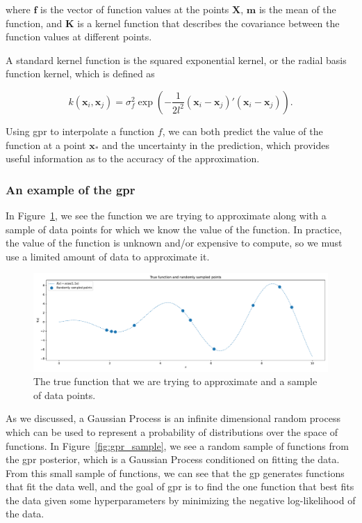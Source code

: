 \documentclass{article}
\begin{document}
where $\mathbf{f}$ is the vector of function values at the points $\mathbf{X}$, $\mathbf{m}$ is the mean of the function, and $\mathbf{K}$ is a kernel function that describes the covariance between the function values at different points.

A standard kernel function is the squared exponential kernel, or the radial basis function kernel, which is defined as

\begin{equation}
k(\mathbf{x}_i, \mathbf{x}_j) = \sigma^2_f \exp\left(-\frac{1}{2l^2} (\mathbf{x}_i - \mathbf{x}_j)' (\mathbf{x}_i -
    \mathbf{x}_j)\right).
\end{equation}

Using \acrshort{gpr} to interpolate a function $f$, we can both predict the value of the function at a point $\mathbf{x}_*$ and the uncertainty in the prediction, which provides useful information as to the accuracy of the approximation.

\subsubsection{An example of the \acrshort{gpr}}

In Figure~\ref{fig:true_function}, we see the function we are trying to approximate along with a sample of data points for which we know the value of the function. In practice, the value of the function is unknown and/or expensive to compute, so we must use a limited amount of data to approximate it.

\begin{figure}[!htbp]
\centering
\includegraphics[width=0.7\linewidth]{files/GPR_True_Function-6a9222b358f68613a1c7eb63bc7f24c7.pdf}
\caption[]{The true function that we are trying to approximate and a sample of data points.}
\label{fig:true_function}
\end{figure}

As we discussed, a Gaussian Process is an infinite dimensional random process which can be used to represent a probability of distributions over the space of functions. In Figure~\ref{fig:gpr_sample}, we see a random sample of functions from the \acrshort{gpr} posterior, which is a Gaussian Process conditioned on fitting the data. From this small sample of functions, we can see that the \acrshort{gp} generates functions that fit the data well, and the goal of \acrshort{gpr} is to find the one function that best fits the data given some hyperparameters by minimizing the negative log-likelihood of the data.
\end{document}
